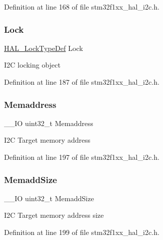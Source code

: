 Definition at line 168 of file stm32f1xx\+\_\+hal\+\_\+i2c.\+h.

\mbox{\label{struct_i2_c___handle_type_def_ad4cf225029dbefe8d3fe660c33b8bb6b}} 
\subsubsection{\texorpdfstring{Lock}{Lock}}
{\footnotesize\ttfamily \hyperlink{stm32f1xx__hal__def_8h_ab367482e943333a1299294eadaad284b}{H\+A\+L\+\_\+\+Lock\+Type\+Def} Lock}

I2C locking object 

Definition at line 187 of file stm32f1xx\+\_\+hal\+\_\+i2c.\+h.

\mbox{\label{struct_i2_c___handle_type_def_a009bdd1b89c6ca994760617de151645d}} 
\subsubsection{\texorpdfstring{Memaddress}{Memaddress}}
{\footnotesize\ttfamily \+\_\+\+\_\+\+IO uint32\+\_\+t Memaddress}

I2C Target memory address 

Definition at line 197 of file stm32f1xx\+\_\+hal\+\_\+i2c.\+h.

\mbox{\label{struct_i2_c___handle_type_def_a4c670e27912a66ef89546d7006d1b06b}} 
\subsubsection{\texorpdfstring{Memadd\+Size}{MemaddSize}}
{\footnotesize\ttfamily \+\_\+\+\_\+\+IO uint32\+\_\+t Memadd\+Size}

I2C Target memory address size 

Definition at line 199 of file stm32f1xx\+\_\+hal\+\_\+i2c.\+h.

